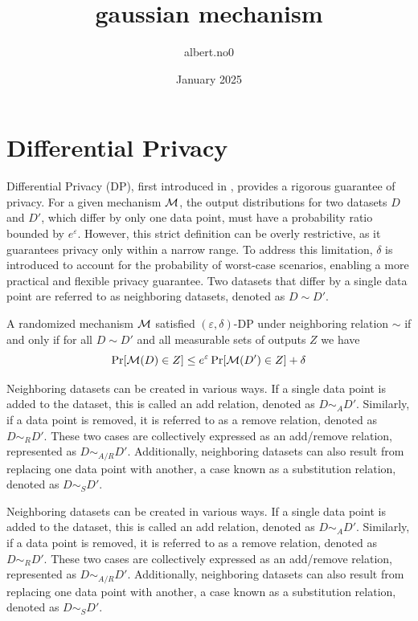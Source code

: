 \documentclass{article}
\title{gaussian mechanism}
\author{albert.no0 }
\date{January 2025}
\begin{document}
\maketitle

\section{Differential Privacy}
Differential Privacy (DP), first introduced in \cite{dwork2006}, provides a rigorous guarantee of privacy. For a given mechanism ${\mathcal{M}}$, the output distributions for two datasets $D$ and $D'$, which differ by only one data point, must have a probability ratio bounded by $e^\varepsilon$. However, this strict definition can be overly restrictive, as it guarantees privacy only within a narrow range. To address this limitation, $\delta$ is introduced to account for the probability of worst-case scenarios, enabling a more practical and flexible privacy guarantee. Two datasets that differ by a single data point are referred to as neighboring datasets, denoted as $D\sim D'$.
\begin{definition}\label{DP}
A randomized mechanism ${\mathcal{M}}$ satisfied $(\varepsilon,\delta)$-DP under neighboring relation $\sim$ if and only if for all $D\sim D'$ and all measurable sets of outputs $Z$ we have 
\begin{equation}
    \Pr[{\mathcal{M}}(D) \in Z] \le e^\varepsilon \Pr[{\mathcal{M}} (D') \in Z] + \delta
\end{equation}    
\end{definition}
Neighboring datasets can be created in various ways. If a single data point is added to the dataset, this is called an add relation, denoted as $D \sim_A D'$. Similarly, if a data point is removed, it is referred to as a remove relation, denoted as $D \sim_R D'$. These two cases are collectively expressed as an add/remove relation, represented as $D \sim_{A/R} D'$. Additionally, neighboring datasets can also result from replacing one data point with another, a case known as a substitution relation, denoted as $D \sim_S D'$.

Neighboring datasets can be created in various ways. If a single data point is added to the dataset, this is called an add relation, denoted as $D \sim_A D'$. Similarly, if a data point is removed, it is referred to as a remove relation, denoted as $D \sim_R D'$. These two cases are collectively expressed as an add/remove relation, represented as $D \sim_{A/R} D'$. Additionally, neighboring datasets can also result from replacing one data point with another, a case known as a substitution relation, denoted as $D \sim_S D'$. 
\end{document}
